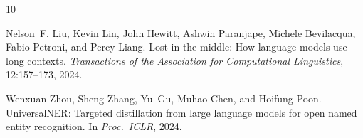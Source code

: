 \documentclass[11pt,a4paper]{article}
\begin{document}

\begin{thebibliography}{10}

Nelson~F. Liu, Kevin Lin, John Hewitt, Ashwin Paranjape, Michele Bevilacqua, Fabio Petroni, and Percy Liang.
\newblock Lost in the middle: How language models use long contexts.
\newblock \emph{Transactions of the Association for Computational Linguistics}, 12:157--173, 2024.

Wenxuan Zhou, Sheng Zhang, Yu~Gu, Muhao Chen, and Hoifung Poon.
\newblock Universal{NER}: Targeted distillation from large language models for open named entity recognition.
\newblock In \emph{Proc.\ ICLR}, 2024.

\end{thebibliography}
\end{document}
